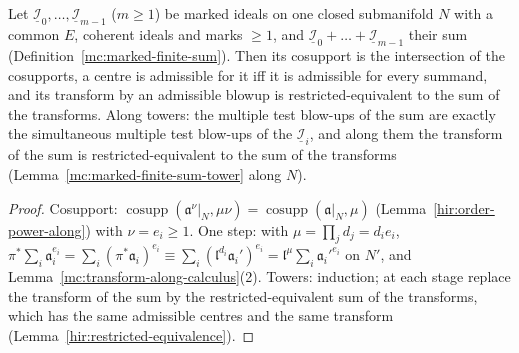 \begin{lemma}
\label{mc:sum-along}
\leanok
Let \(\underline{\mathcal I}_0,\dots,\underline{\mathcal I}_{m-1}\) (\(m\ge1\)) be marked ideals on one closed submanifold \(N\) with a common \(E\), coherent ideals and marks \(\ge1\), and
\(\underline{\mathcal I}_0+\dots+\underline{\mathcal I}_{m-1}\) their sum (Definition~\ref{mc:marked-finite-sum}). Then its cosupport is the intersection of the cosupports, a
centre is admissible for it iff it is admissible for every summand, and its transform by an admissible blowup is restricted-equivalent to the sum of the transforms. Along
towers: the multiple test blow-ups of the sum are exactly the simultaneous multiple test blow-ups of the \(\underline{\mathcal I}_i\), and along them the transform of the
sum is restricted-equivalent to the sum of the transforms (Lemma~\ref{mc:marked-finite-sum-tower} along \(N\)).
\end{lemma}
\begin{proof}
\leanok
Cosupport: \(\operatorname{cosupp}(\mathfrak a^\nu|_N,\mu\nu)=\operatorname{cosupp}(\mathfrak a|_N,\mu)\) (Lemma~\ref{hir:order-power-along}) with \(\nu=e_i\ge1\). One step: with
\(\mu=\prod_jd_j=d_ie_i\), \(\pi^*\sum_i\mathfrak a_i^{e_i}=\sum_i(\pi^*\mathfrak a_i)^{e_i}\equiv\sum_i(\mathfrak l^{d_i}\mathfrak a_i')^{e_i}=\mathfrak l^\mu\sum_i\mathfrak a_i'^{e_i}\) on
\(N'\), and Lemma~\ref{mc:transform-along-calculus}(2). Towers: induction; at each stage replace the transform of the sum by the restricted-equivalent sum of the transforms,
which has the same admissible centres and the same transform (Lemma~\ref{hir:restricted-equivalence}).
\end{proof}

